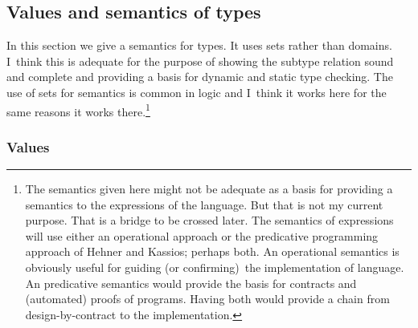 \documentclass[12pt]{article}
\begin{document}
\subsection{Values and semantics of types}

In this section we give a semantics for types. It uses sets rather than
domains. I\ think this is adequate for the purpose of showing the subtype
relation sound and complete and providing a basis for dynamic and static
type checking. The use of sets for semantics is common in logic and I\ think
it works here for the same reasons it works there.\footnote{%
The semantics given here might not be adequate as a basis for providing a
semantics to the expressions of the language. But that is not my current
purpose. That is a bridge to be crossed later. The semantics of expressions
will use either an operational approach or the predicative programming
approach of Hehner and Kassios; perhaps both. An operational semantics is
obviously useful for guiding (or confirming)\ the implementation of
language. An predicative semantics would provide the basis for contracts and
(automated) proofs of programs. Having both would provide a chain from
design-by-contract to the implementation.}

\subsubsection{Values}
\end{document}

